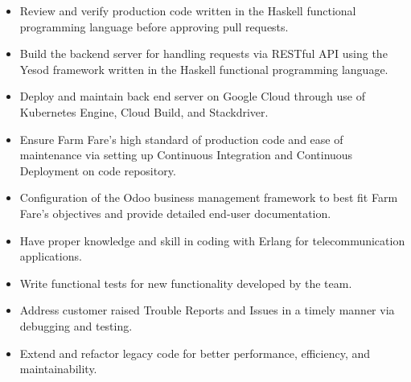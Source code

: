\documentclass[10pt,a4paper]{altacv}
\begin{document}
\medskip

\divider

\small{
\begin{itemize}
\item Review and verify production code written in the Haskell functional programming language before approving pull requests.

\item Build the backend server for handling requests via RESTful API using the Yesod framework written in the Haskell functional programming language.

\item Deploy and maintain back end server on Google Cloud through use of Kubernetes Engine, Cloud Build, and Stackdriver.

\item Ensure Farm Fare's high standard of production code and ease of maintenance via setting up Continuous Integration and Continuous Deployment on code repository. 

\item Configuration of the Odoo business management framework to best fit Farm Fare's objectives and provide detailed end-user documentation.

\end{itemize}
}

\medskip

\divider

\small{
\begin{itemize}
\item Have proper knowledge and skill in coding with Erlang for telecommunication applications.

\item Write functional tests for new functionality developed by the team.

\item Address customer raised Trouble Reports and Issues in a timely manner via debugging and testing.

\item Extend and refactor legacy code for better performance, efficiency, and maintainability.

\end{itemize}
}

\newpage
\begin{fullwidth}
\makecvheader
\end{fullwidth}
\end{document}
